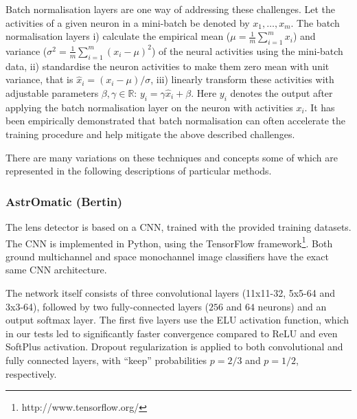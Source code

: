 \documentclass{aa}
\newcommand{\fl}[1]{{\color{magenta}FL: #1}}
\begin{document}
Batch normalisation layers \citep{batch_norm} are one way of addressing these challenges.  Let the activities of a given neuron in a mini-batch be denoted by $x_1,\ldots,x_m$. The batch normalisation layers i) calculate the empirical mean ($\mu = \frac{1}{m}\sum_{i=1}^m x_i $) and variance ($\sigma^2 = \frac{1}{m}\sum_{i=1}^m (x_i-\mu)^2 $) of the neural activities using the mini-batch data, ii) standardise the neuron activities to make them zero mean with unit variance, that is $\hat x_i = (x_i-\mu)/\sigma$, iii) linearly transform these activities with adjustable parameters $\beta, \gamma \in \mathbb{R}$: $y_i=\gamma\hat x_i +\beta$. Here $y_i$ denotes the output after applying the batch normalisation layer on the neuron with activities $x_i$. It has been empirically demonstrated that batch normalisation can often accelerate the training procedure and help mitigate the above described challenges.

There are many variations on these techniques and concepts some of which are represented in the following descriptions of particular methods.  

\subsubsection{AstrOmatic (Bertin)}
\label{sec:AstrOmatic}

The lens detector is based on a CNN, trained with the provided training datasets. The CNN is implemented in Python, using the TensorFlow framework\footnote{http://www.tensorflow.org/}. Both ground multichannel and space monochannel image classifiers have the exact same CNN architecture.

The network itself consists of three convolutional layers (11x11-32, 5x5-64 and 3x3-64), followed by two fully-connected layers ($256$ and $64$ neurons) and an output softmax layer. The first five layers use the ELU activation function, which in our tests led to significantly faster convergence compared to ReLU and even SoftPlus activation. Dropout regularization is applied to both convolutional and fully connected layers, with ``keep'' probabilities $p=2/3$ and $p=1/2$, respectively.
\end{document}
